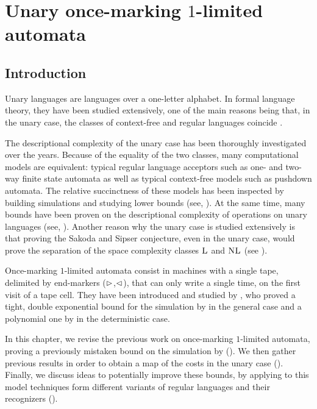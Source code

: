 \chapter{Unary once-marking \texorpdfstring{$1$}{1}-limited automata}



\section{Introduction}
Unary languages are languages over a one-letter alphabet.
In formal language theory, they have been studied extensively, one of the main reasons being that, in the unary case, the classes of context-free and regular languages coincide \cite{GinRic62}.

The descriptional complexity of the unary case has been thoroughly investigated over the years.
Because of the equality of the two classes, many computational models are equivalent: typical regular language acceptors such as one- and two-way finite state automata as well as typical context-free models such as pushdown automata.
The relative succinctness of these models has been inspected by building simulations and studying lower bounds (see, \eg[,] \cite{GefMer+03,MerPig01,Pig08,PigSha+02}).
At the same time, many bounds have been proven on the descriptional complexity of operations on unary languages (see, \eg[,] \cite{HolKut03,KunOkh12,MerPig05,PigSha02}).
Another reason why the unary case is studied extensively is that proving the Sakoda and Sipser conjecture, even in the unary case, would prove the separation of the space complexity classes $\textsc{L}$ and $\textsc{NL}$ (see ).

Once-marking $1$-limited automata consist in machines with a single tape, delimited by end-markers ($\rhd$,$\lhd$), that can only write a single time, on the first visit of a tape cell.
They have been introduced and studied by \citeauthor{PigPri23a}, who proved a tight, double exponential bound for the simulation by \ODFAs in the general case and a polynomial one by \TDFA in the deterministic case.

In this chapter, we revise the previous work on once-marking $1$-limited automata, proving a previously mistaken bound on the simulation by \ONFA ().
We then gather previous results in order to obtain a map of the costs in the unary case ().
Finally, we discuss ideas to potentially improve these bounds, by applying to this model techniques form different variants of regular languages and their recognizers ().



